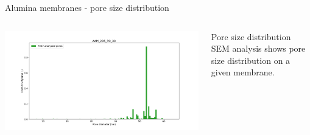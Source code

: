 \documentclass[../defence.tex]{subfiles}
\begin{document}
  \begin{frame}{Alumina membranes - pore size distribution}
    \begin{columns}[onlytextwidth, T]
        \includegraphics[width=\linewidth]{images/AAM_295_PO_30_hist.png}
        \begin{block}{Pore size distribution}
          SEM analysis shows pore size distribution on a given membrane.
        \end{block}
    \end{columns}
  \end{frame}
\end{document}
